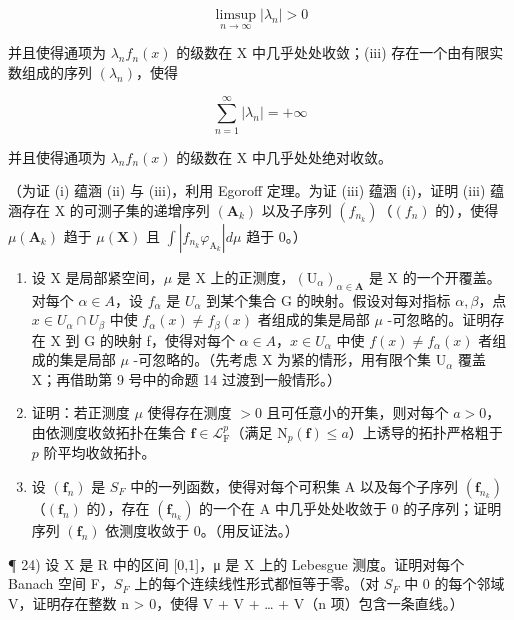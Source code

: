 \[
\limsup _ {n \to \infty} | \lambda_ {n} | > 0
\]

并且使得通项为 \(\lambda_{n}f_{n}(x)\) 的级数在 X 中几乎处处收敛；(iii) 存在一个由有限实数组成的序列 \((\lambda_n)\)，使得

\[
\sum_ {n = 1} ^ {\infty} | \lambda_ {n} | = + \infty
\]

并且使得通项为 \(\lambda_{n}f_{n}(x)\) 的级数在 X 中几乎处处绝对收敛。

（为证 (i) 蕴涵 (ii) 与 (iii)，利用 Egoroff 定理。为证 (iii) 蕴涵 (i)，证明 (iii) 蕴涵存在 X 的可测子集的递增序列 \((\mathbf{A}_k)\) 以及子序列 \((f_{n_k})\)（\((f_n)\) 的），使得 \(\mu (\mathbf{A}_k)\) 趋于 \(\mu (\mathbf{X})\) 且 \(\int |f_{n_k}\varphi_{\mathrm{A}_k}|d\mu\) 趋于 0。）

\begin{enumerate}
\def\labelenumi{\arabic{enumi})}
\setcounter{enumi}{20}
\item
  设 X 是局部紧空间，\(\mu\) 是 X 上的正测度，\((\mathrm{U}_{\alpha})_{\alpha\in\mathbf{A}}\) 是 X 的一个开覆盖。对每个 \(\alpha\in A\)，设 \(f_{\alpha}\) 是 \(U_{\alpha}\) 到某个集合 G 的映射。假设对每对指标 \(\alpha,\beta\)，点 \(x\in U_{\alpha}\cap U_{\beta}\) 中使 \(f_{\alpha}(x)\neq f_{\beta}(x)\) 者组成的集是局部 \(\mu\) -可忽略的。证明存在 X 到 G 的映射 f，使得对每个 \(\alpha\in A\)，\(x\in U_{\alpha}\) 中使 \(f(x)\neq f_{\alpha}(x)\) 者组成的集是局部 \(\mu\) -可忽略的。（先考虑 X 为紧的情形，用有限个集 \(\mathrm{U}_{\alpha}\) 覆盖 X；再借助第 9 号中的命题 14 过渡到一般情形。）
\item
  证明：若正测度 \(\mu\) 使得存在测度 \(>0\) 且可任意小的开集，则对每个 \(a > 0\)，由依测度收敛拓扑在集合 \(\mathbf{f} \in \mathcal{L}_{\mathrm{F}}^{p}\)（满足 \(\mathrm{N}_p(\mathbf{f}) \leqslant a\)）上诱导的拓扑严格粗于 \(p\) 阶平均收敛拓扑。
\item
  设 \((\mathbf{f}_{n})\) 是 \(S_{F}\) 中的一列函数，使得对每个可积集 A 以及每个子序列 \((\mathbf{f}_{n_{k}})\)（\((\mathbf{f}_{n})\) 的），存在 \((\mathbf{f}_{n_{k}})\) 的一个在 A 中几乎处处收敛于 0 的子序列；证明序列 \((\mathbf{f}_{n})\) 依测度收敛于 0。（用反证法。）
\end{enumerate}

¶ 24) 设 X 是 R 中的区间 {[}0,1{]}，μ 是 X 上的 Lebesgue 测度。证明对每个 Banach 空间 F，\(S_F\) 上的每个连续线性形式都恒等于零。（对 \(S_F\) 中 0 的每个邻域 V，证明存在整数 n \textgreater{} 0，使得 V + V + \ldots{} + V（n 项）包含一条直线。）

